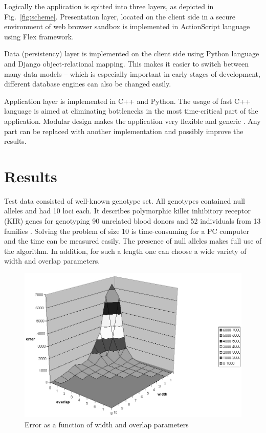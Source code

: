 \documentclass[]{spie}
\begin{document}
Logically the application is spitted into three layers, as depicted in Fig.~\ref{fig:scheme}.
Presentation layer, located on the client side in a secure environment of web browser sandbox is implemented in ActionScript language using Flex framework.

Data (persistency) layer is implemented on the client side using Python language and Django object-relational mapping.
This makes it easier to switch between many data models -- which is especially important in early stages of development,
different database engines can also be changed easily.

Application layer is implemented in C++ and Python.
The usage of fast C++ language is aimed at eliminating bottlenecks in the most time-critical part of the application.
Modular design makes the application very flexible and generic \cite{boost}.
Any part can be replaced with another implementation and possibly improve the results.

\section{Results}

Test data consisted of well-known genotype set.
All genotypes contained null alleles and had 10 loci each.
It describes polymorphic killer inhibitory receptor (KIR) genes for genotyping 90 unrelated blood donors and 52 individuals from 13 families
\cite{crum2000development}.
Solving the problem of size 10 is time-consuming for a PC computer and the time can be measured easily.
The presence of null alleles makes full use of the algorithm.
In addition, for such a length one can choose a wide variety of width and overlap parameters.

\begin{figure}[!htb]
\centering
\includegraphics[scale=0.4]{images/error}
\caption{Error as a function of width and overlap parameters}
\label{fig:error}
\end{figure}
\end{document}

